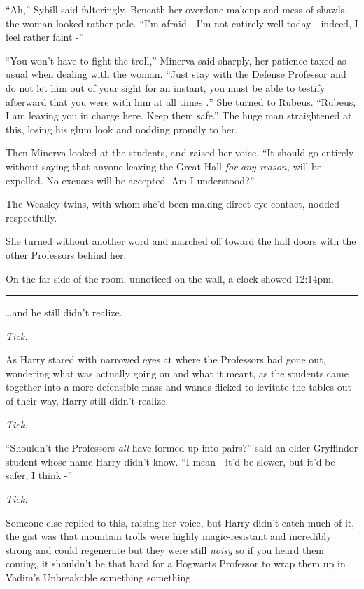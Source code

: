 ``Ah,'' Sybill said falteringly. Beneath her overdone makeup and mess of
shawls, the woman looked rather pale. ``I'm afraid - I'm not entirely
well today - indeed, I feel rather faint -''

``You won't have to fight the troll,'' Minerva said sharply, her
patience taxed as usual when dealing with the woman. ``Just stay with
the Defense Professor and do not let him out of your sight for an
instant, you must be able to testify afterward that you were with him at
all times \emph{.}'' She turned to Rubeus. ``Rubeus, I am leaving you in
charge here. Keep them safe.'' The huge man straightened at this, losing
his glum look and nodding proudly to her.

Then Minerva looked at the students, and raised her voice. ``It should
go entirely without saying that anyone leaving the Great Hall \emph{for
any reason,} will be expelled. No excuses will be accepted. Am I
understood?''

The Weasley twins, with whom she'd been making direct eye contact,
nodded respectfully.

She turned without another word and marched off toward the hall doors
with the other Professors behind her.

On the far side of the room, unnoticed on the wall, a clock showed
12:14pm.

\begin{center}\rule{3in}{0.4pt}\end{center}

\ldots{}and he still didn't realize.

\emph{Tick.}

As Harry stared with narrowed eyes at where the Professors had gone out,
wondering what was actually going on and what it meant, as the students
came together into a more defensible mass and wands flicked to levitate
the tables out of their way, Harry still didn't realize.

\emph{Tick.}

``Shouldn't the Professors \emph{all} have formed up into pairs?'' said
an older Gryffindor student whose name Harry didn't know. ``I mean -
it'd be slower, but it'd be safer, I think -''

\emph{Tick.}

Someone else replied to this, raising her voice, but Harry didn't catch
much of it, the gist was that mountain trolls were highly
magic-resistant and incredibly strong and could regenerate but they were
still \emph{noisy} so if you heard them coming, it shouldn't be that
hard for a Hogwarts Professor to wrap them up in Vadim's Unbreakable
something something.

